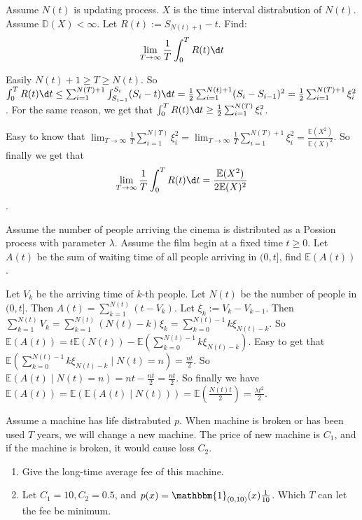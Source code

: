 \documentclass[../main]{subfiles}
\begin{document}
\begin{problem}\label{pro:1}
  Assume \(N(t)\) is updating process. \(X\) is the time interval distrabution of \(N(t)\).
  Assume \(\mathbb{D}(X)<\infty\).
  Let \(R(t):=S_{N(t)+1}-t\). Find:
  \[
    \lim_{T \to \infty} \frac{1}{T}\int_{0}^{T}R(t) \d t
  \]
\end{problem}
\begin{solution}
  Easily \(N(t)+1 \geq T \geq N(t)\).
  So \(\int_{0}^{T}R(t) \d t \leq \sum_{i=1}^{N(T)+1} \int_{S_{i-1}}^{S_i}(S_i-t) \d t=\frac{1}{2}\sum_{i=1}^{N(t)+1} (S_i-S_{i-1})^2=\frac{1}{2} \sum_{i=1}^{N(T)+1} \xi_i^2\).
  For the same reason, we get that \(\int_{0}^{T}R(t) \d t \geq \frac{1}{2} \sum_{i=1}^{N(T)} \xi_i^2\).

  Easy to know that \(\lim_{T \to \infty} \frac{1}{T} \sum_{i=1}^{N(T)} \xi_i^2=\lim_{T \to \infty} \frac{1}{T} \sum_{i=1}^{N(T)+1} \xi_i^2=\frac{\mathbb{E}(X^2)}{\mathbb{E}(X)^2}\).
  So finally we get that
  \[
    \lim_{T \to \infty} \frac{1}{T}\int_{0}^{T}R(t) \d t=\frac{\mathbb{E}(X^2)}{2\mathbb{E}(X)^2}
  \]
  .
\end{solution}
\begin{problem}\label{pro:2}
  Assume the number of people arriving the cinema is distributed as a Possion process with parameter \(\lambda\).
  Assume the film begin at a fixed time \(t \geq 0\).
  Let \(A(t)\) be the sum of waiting time of all people arriving in \((0,t]\), find \(\mathbb{E}(A(t))\).
\end{problem}
\begin{solution}
  Let \(V_k\) be the arriving time of \(k\)-th people. Let \(N(t)\) be the number of people in \((0,t]\).
  Then \(A(t)=\sum_{k=1}^{N(t)} (t-V_k)\). Let \(\xi_k:=V_k-V_{k-1}\).
  Then \(\sum_{k=1}^{N(t)} V_k=\sum_{k=1}^{N(t)} (N(t)-k)\xi_k=\sum_{k=0}^{N(t)-1} k \xi_{N(t)-k}\).
  So \(\mathbb{E}(A(t))=t \mathbb{E}(N(t))-\mathbb{E}(\sum_{k=0}^{N(t)-1} k\xi_{N(t)-k})\).
  Easy to get that \(\mathbb{E}(\sum_{k=0}^{N(t)-1} k\xi_{N(t)-k} \mid N(t)=n)=\frac{nt}{2}\).
  So \(\mathbb{E}(A(t) \mid N(t)=n)=nt-\frac{nt}{2}=\frac{nt}{2}\).
  So finally we have \(\mathbb{E}(A(t))=\mathbb{E}(\mathbb{E}(A(t) \mid N(t)))=\mathbb{E}(\frac{N(t)t}{2})=\frac{\lambda t^2}{2}\).
\end{solution}
\begin{problem}\label{pro:3}
  Assume a machine has life distrabuted \(p\). When machine is broken or has been used \(T\) years, we will change a new machine.
  The price of new machine is \(C_1\), and if the machine is broken, it would cause loss \(C_2\).
  \begin{enumerate}
    \item Give the long-time average fee of this machine.
    \item Let \(C_1=10,C_2=0.5\), and \(p(x)=\mathbbm{1}_{(0,10)}(x) \frac{1}{10}\).
      Which \(T\) can let the fee be minimum.
  \end{enumerate}
\end{problem}
\end{document}
